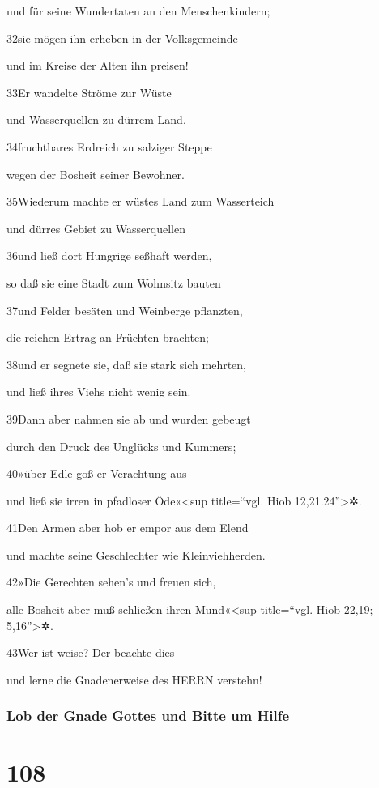 und für seine Wundertaten an den Menschenkindern;

32sie mögen ihn erheben in der Volksgemeinde

und im Kreise der Alten ihn preisen!

33Er wandelte Ströme zur Wüste

und Wasserquellen zu dürrem Land,

34fruchtbares Erdreich zu salziger Steppe

wegen der Bosheit seiner Bewohner.

35Wiederum machte er wüstes Land zum Wasserteich

und dürres Gebiet zu Wasserquellen

36und ließ dort Hungrige seßhaft werden,

so daß sie eine Stadt zum Wohnsitz bauten

37und Felder besäten und Weinberge pflanzten,

die reichen Ertrag an Früchten brachten;

38und er segnete sie, daß sie stark sich mehrten,

und ließ ihres Viehs nicht wenig sein.

39Dann aber nahmen sie ab und wurden gebeugt

durch den Druck des Unglücks und Kummers;

40»über Edle goß er Verachtung aus

und ließ sie irren in pfadloser Öde«\textless sup title=``vgl. Hiob
12,21.24''\textgreater✲.

41Den Armen aber hob er empor aus dem Elend

und machte seine Geschlechter wie Kleinviehherden.

42»Die Gerechten sehen's und freuen sich,

alle Bosheit aber muß schließen ihren Mund«\textless sup title=``vgl.
Hiob 22,19; 5,16''\textgreater✲.

43Wer ist weise? Der beachte dies

und lerne die Gnadenerweise des HERRN verstehn!

\hypertarget{lob-der-gnade-gottes-und-bitte-um-hilfe}{%
\subsubsection{Lob der Gnade Gottes und Bitte um
Hilfe}\label{lob-der-gnade-gottes-und-bitte-um-hilfe}}

\hypertarget{section-107}{%
\section{108}\label{section-107}}

